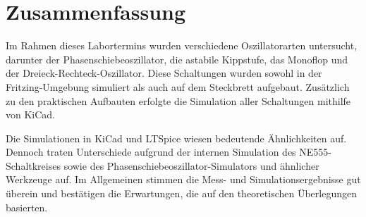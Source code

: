 %
%
%
\section{Zusammenfassung}
%

Im Rahmen dieses Labortermins wurden verschiedene Oszillatorarten untersucht, darunter der Phasenschiebeoszillator, die astabile Kippstufe, das Monoflop und der Dreieck-Rechteck-Oszillator. Diese Schaltungen wurden sowohl in der Fritzing-Umgebung simuliert als auch auf dem Steckbrett aufgebaut. Zusätzlich zu den praktischen Aufbauten erfolgte die Simulation aller Schaltungen mithilfe von KiCad.

Die Simulationen in KiCad und LTSpice wiesen bedeutende Ähnlichkeiten auf. Dennoch traten Unterschiede aufgrund der internen Simulation des NE555-Schaltkreises sowie des Phasenschiebeoszillator-Simulators und ähnlicher Werkzeuge auf. Im Allgemeinen stimmen die Mess- und Simulationsergebnisse gut überein und bestätigen die Erwartungen, die auf den theoretischen Überlegungen basierten.
